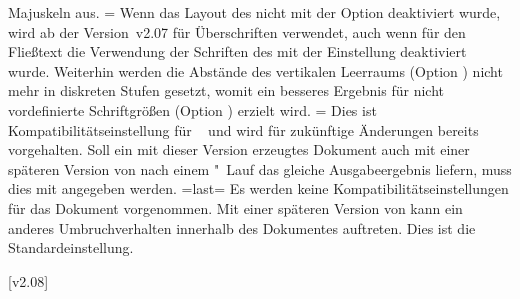 \begin{DeclareEntity*}{}
\begin{DeclareEntity*}{}
\begin{DeclareEntity*}{}
\begin{Declaration}
\begin{DeclareValues}
  Majuskeln aus.
=
  Wenn das Layout des \CDs nicht mit der Option  deaktiviert 
  wurde, wird ab der Version~v2.07 für Überschriften \OpenSans verwendet, auch 
  wenn für den Fließtext die Verwendung der Schriften des \CDs mit der 
  Einstellung  deaktiviert wurde. Weiterhin werden die 
  Abstände des vertikalen Leerraums (Option ) nicht 
  mehr in diskreten Stufen gesetzt, womit ein besseres Ergebnis für nicht 
  vordefinierte Schriftgrößen (Option ) erzielt wird.
=
  Dies ist Kompatibilitätseinstellung für \TUDScript~\vTUDScript{} und wird für 
  zukünftige Änderungen bereits vorgehalten. Soll ein mit dieser Version 
  erzeugtes Dokument auch mit einer späteren Version von \TUDScript nach einem 
  "~Lauf das gleiche Ausgabeergebnis liefern, muss dies mit 
   angegeben werden.
\itemval=last=
  Es werden keine Kompatibilitätseinstellungen für das Dokument vorgenommen. 
  Mit einer späteren Version von \TUDScript kann ein anderes Umbruchverhalten 
  innerhalb des Dokumentes auftreten. Dies ist die Standardeinstellung.%
\end{DeclareValues}
\end{Declaration}
%
[v2.08]

\end{DeclareEntity*}
\end{DeclareEntity*}
\end{DeclareEntity*}
